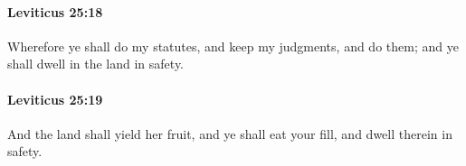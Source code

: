 		\paragraph{Leviticus 25:18} %
			\label{LEVITICUS-25-18}

			Wherefore ye shall do my statutes, and keep my judgments, and do them; and ye shall dwell in the land in safety.


		\paragraph{Leviticus 25:19} %
			\label{LEVITICUS-25-19}

			And the land shall yield her fruit, and ye shall eat your fill, and dwell therein in safety.


